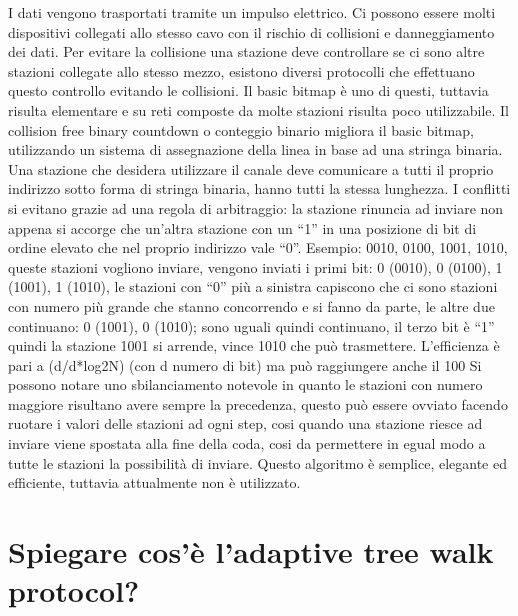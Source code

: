 I dati vengono trasportati tramite un impulso elettrico. Ci possono essere molti dispositivi collegati allo stesso cavo con il rischio di collisioni e danneggiamento dei dati.
Per evitare la collisione una stazione deve controllare se ci sono altre stazioni collegate allo stesso mezzo, esistono diversi protocolli che effettuano questo controllo evitando le collisioni.
Il basic bitmap è uno di questi, tuttavia risulta elementare e su reti composte da molte stazioni risulta poco utilizzabile.
Il collision free binary countdown o conteggio binario migliora il basic bitmap, utilizzando un sistema di assegnazione della linea in base ad una stringa binaria.
Una stazione che desidera utilizzare il canale deve comunicare a tutti il proprio indirizzo sotto forma di stringa binaria, hanno tutti la stessa lunghezza.
I conflitti si evitano grazie ad una regola di arbitraggio: la stazione rinuncia ad inviare non appena si accorge che un’altra stazione con un “1” in una posizione di bit di ordine elevato che nel proprio indirizzo vale “0”.
Esempio: 0010, 0100, 1001, 1010, queste stazioni vogliono inviare, vengono inviati i primi bit: 0 (0010), 0 (0100), 1 (1001), 1 (1010), le stazioni con “0” più a sinistra capiscono che ci sono stazioni con numero più grande che stanno concorrendo e si fanno da parte, le altre due continuano: 0 (1001), 0 (1010); sono uguali quindi continuano, il terzo bit è “1” quindi la stazione 1001 si arrende, vince 1010 che può trasmettere.
L’efficienza è pari a (d/d*log2N) (con d numero di bit) ma può raggiungere anche il 100%
Si possono notare uno sbilanciamento notevole in quanto le stazioni con numero maggiore risultano avere sempre la precedenza, questo può essere ovviato facendo ruotare i valori delle stazioni ad ogni step, cosi quando una stazione riesce ad inviare viene spostata alla fine della coda, cosi da permettere in egual modo a tutte le stazioni la possibilità di inviare.
Questo algoritmo è semplice, elegante ed efficiente, tuttavia attualmente non è utilizzato.

 

\section{Spiegare cos’è l’adaptive tree walk protocol?}

